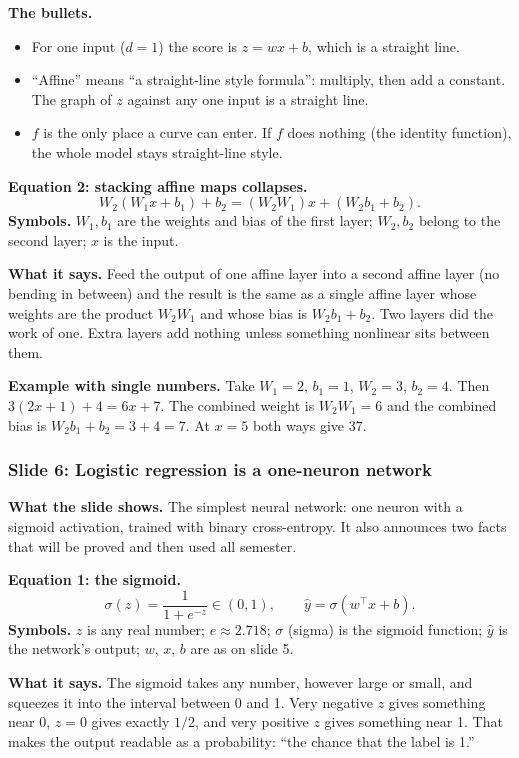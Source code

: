 \textbf{The bullets.}
\begin{itemize}
\item For one input ($d=1$) the score is $z = wx + b$, which is a straight line.
\item ``Affine'' means ``a straight-line style formula'': multiply, then add a constant. The graph of $z$ against any one input is a straight line.
\item $f$ is the only place a curve can enter. If $f$ does nothing (the identity function), the whole model stays straight-line style.
\end{itemize}

\textbf{Equation 2: stacking affine maps collapses.}
\[
W_2(W_1 x + b_1) + b_2 = (W_2 W_1)x + (W_2 b_1 + b_2).
\]
\textbf{Symbols.} $W_1, b_1$ are the weights and bias of the first layer; $W_2, b_2$ belong to the second layer; $x$ is the input.

\textbf{What it says.} Feed the output of one affine layer into a second affine layer (no bending in between) and the result is the same as a single affine layer whose weights are the product $W_2W_1$ and whose bias is $W_2b_1 + b_2$. Two layers did the work of one. Extra layers add nothing unless something nonlinear sits between them.

\textbf{Example with single numbers.} Take $W_1 = 2$, $b_1 = 1$, $W_2 = 3$, $b_2 = 4$. Then $3(2x+1)+4 = 6x+7$. The combined weight is $W_2W_1 = 6$ and the combined bias is $W_2b_1+b_2 = 3+4 = 7$. At $x=5$ both ways give $37$.

\subsubsection{Slide 6: Logistic regression is a one-neuron network}

\textbf{What the slide shows.} The simplest neural network: one neuron with a sigmoid activation, trained with binary cross-entropy. It also announces two facts that will be proved and then used all semester.

\textbf{Equation 1: the sigmoid.}
\[
\sigma(z) = \frac{1}{1+e^{-z}} \in (0,1), \qquad \hat{y} = \sigma(w^\top x + b).
\]
\textbf{Symbols.} $z$ is any real number; $e \approx 2.718$; $\sigma$ (sigma) is the sigmoid function; $\hat{y}$ is the network's output; $w$, $x$, $b$ are as on slide 5.

\textbf{What it says.} The sigmoid takes any number, however large or small, and squeezes it into the interval between 0 and 1. Very negative $z$ gives something near 0, $z=0$ gives exactly $1/2$, and very positive $z$ gives something near 1. That makes the output readable as a probability: ``the chance that the label is 1.''

